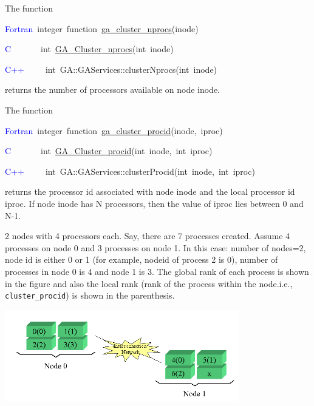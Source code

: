 The function
\begin{lyxcode}
\textcolor{blue}{Fortran}~integer~function~\href{http://www.emsl.pnl.gov/docs/global/ga_ops.html\#ga_cluster_nprocs}{ga\_{}cluster\_{}nprocs}(inode)

\textcolor{blue}{C}~~~~~~~int~\href{http://www.emsl.pnl.gov/docs/global/c_nga_ops.html\#ga_cluster_nprocs}{GA\_{}Cluster\_{}nprocs}(int~inode)~

\textcolor{blue}{C++~~~~}~int~GA::GAServices::clusterNprocs(int~inode)
\end{lyxcode}
returns the number of processors available on node inode.

The function
\begin{lyxcode}
\textcolor{blue}{Fortran}~integer~function~\href{http://www.emsl.pnl.gov/docs/global/ga_ops.html\#ga_cluster_procid}{ga\_{}cluster\_{}procid}(inode,~iproc)~

\textcolor{blue}{C}~~~~~~~int~\href{http://www.emsl.pnl.gov/docs/global/c_nga_ops.html\#ga_cluster_procid}{GA\_{}Cluster\_{}procid}(int~inode,~int~iproc)~

\textcolor{blue}{C++}~~~~~int~GA::GAServices::clusterProcid(int~inode,~int~iproc)
\end{lyxcode}
returns the processor id associated with node inode and the local
processor id iproc. If node inode has N processors, then the value
of iproc lies between 0 and N-1.

\textit{} 2 nodes with 4 processors each. Say,
there are 7 processes created. Assume 4 processes on node 0 and 3
processes on node 1. In this case: number of nodes=2, node id is either
0 or 1 (for example, nodeid of process 2 is 0), number of processes
in node 0 is 4 and node 1 is 3. The global rank of each process is
shown in the figure and also the local rank (rank of the process within
the node.i.e., \texttt{cluster\_procid}) is shown in the parenthesis.

\begin{flushleft}
\includegraphics[width=4in]{cluster}
\par\end{flushleft}


